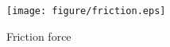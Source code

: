 \documentclass{article_vdlab_sotsuron_youshi}
\begin{document}
\vspace{1mm}
\begin{figure}[h]
%       
	\begin{center}
	  \texttt{[image: figure/friction.eps]}
	  \end{center}
    \vspace{-1mm}
    \caption{Friction force}
    \label{fig:force}
\end{figure}

\end{document}
